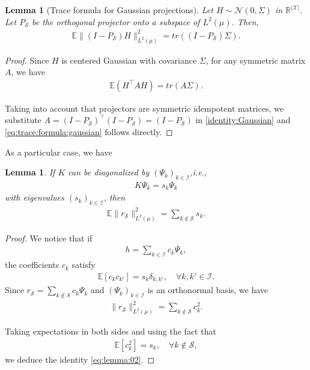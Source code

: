 \documentclass[letterpaper,11pt]{article}
\numberwithin{equation}{section}
\newtheorem{lemma}[theorem]{Lemma}
\numberwithin{equation}{section}
\begin{document}
\begin{lemma}[Trace formula for Gaussian projections]
    \label{lemma:trace:formula:gaussian:projections}
    Let $H\sim \mathcal{N}(0,\Sigma)$ in $\mathbb{R}^{|\mathcal{X}|}$. Let $P_{\mathcal{S}}$ be the orthogonal projector onto a subspace of $L^2(\mu)$. Then,
    \begin{align}
        \label{eq:trace:formula:gaussian}
        \mathbb{E}\|(I-P_{\mathcal{S}})H\|_{L^2(\mu)}^2=tr((I-P_{\mathcal{S}})\Sigma).
    \end{align}
\end{lemma}

\begin{proof}
    Since $H$ is centered Gaussian with covariance $\Sigma$, for any symmetric matrix $A$, we have 
    \begin{align}
        \label{identity:Gaussian}
        \mathbb{E}(H^\top AH)=tr(A\Sigma).
    \end{align}

    Taking into account that projectors are symmetric idempotent matrices, we substitute $A=(I-P_\mathcal{S})^\top (I-P_{\mathcal{S}})=(I-P_{\mathcal{S}})$ in \eqref{identity:Gaussian} and \eqref{eq:trace:formula:gaussian} follows directly. 
\end{proof}

As a particular case, we have

\begin{lemma}
    \label{lemma:E:rS}
    If $K$ can be diagonalized by $(\Psi_k)_{k\in \mathcal{I}}$,i.e.,
    \begin{align*}
        K\Psi_k=s_k\Psi_k
    \end{align*}
    with eigenvalues $(s_k)_{k\in \mathcal{I}}$, then
    \begin{align}
        \label{eq:lemma:02} \mathbb{E}\|r_\mathcal{S}\|_{L^2(\mu)}^2 = \sum_{k\notin \mathcal{S}} s_k.
    \end{align}
\end{lemma}

\begin{proof}
    We notice that if 
    \begin{align*}
        h=\sum_{k\in \mathcal{I}} c_k \Psi_k,
    \end{align*}
    the coefficients $c_k$ satisfy
    \begin{align*}
        \mathbb{E}[c_kc_{k'}]=s_k \delta_{k,k'},\quad \forall k,k'\in \mathcal{I}.
    \end{align*}
    Since $r_{\mathcal{S}}=\sum_{k\notin S} c_k \Psi_k$ and $(\Psi_k)_{k\in \mathcal{I}}$ is an orthonormal basis, we have
    \begin{align*}
        \|r_{\mathcal{S}}\|_{L^2(\mu)}^2 = \sum_{k\notin \mathcal{S}} c_k^2.
    \end{align*}

    Taking expectations in both sides and using the fact that 
    \begin{align*}
        \mathbb{E}[c_k^2]=s_k,\quad \forall k\notin \mathcal{S},
    \end{align*}
    we deduce the identity \eqref{eq:lemma:02}.
\end{proof}
\end{document}
